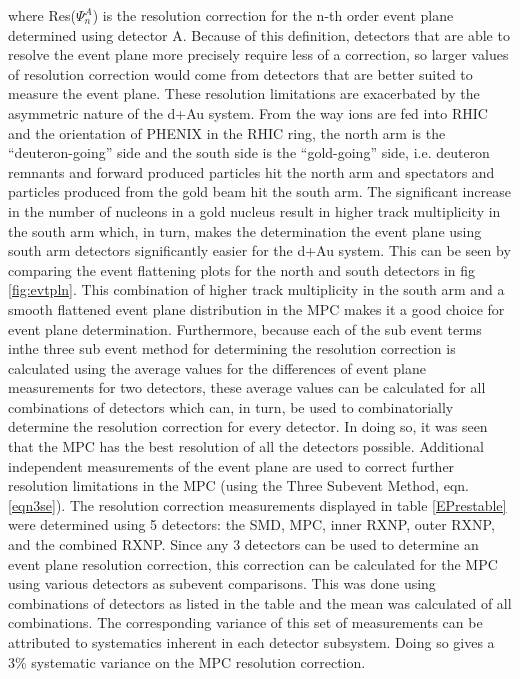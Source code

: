 where Res($\Psi_n^A$) is the resolution correction for the n-th order event plane determined using detector A. Because of this definition, detectors that are able to resolve the event plane more precisely require less of a correction, so larger values of resolution correction would come from detectors that are better suited to measure the event plane. These resolution limitations are exacerbated by the asymmetric nature of the d+Au system. From the way ions are fed into RHIC and the orientation of PHENIX in the RHIC ring, the north arm is the ``deuteron-going'' side and the south side is the ``gold-going'' side, i.e. deuteron remnants and forward produced particles hit the north arm and spectators and particles produced from the gold beam hit the south arm. The significant increase in the number of nucleons in a gold nucleus result in higher track multiplicity in the south arm which, in turn, makes the determination the event plane using south arm detectors significantly easier for the d+Au system. This can be seen by comparing the event flattening plots for the north and south detectors in fig \ref{fig:evtpln}. This combination of higher track multiplicity in the south arm and a smooth flattened event plane distribution in the MPC makes it a good choice for event plane determination. Furthermore, because each of the sub event terms inthe three sub event method for determining the resolution correction is calculated using the average values for the differences of event plane measurements for two detectors, these average values can be calculated for all combinations of detectors which can, in turn, be used to combinatorially determine the resolution correction for every detector. In doing so, it was seen that the MPC has the best resolution of all the detectors possible. Additional independent measurements of the event plane are used to correct further resolution limitations in the MPC (using the Three Subevent Method, eqn. \ref{eqn3se}). The resolution correction measurements displayed in table \ref{EPrestable} were determined using 5 detectors: the SMD, MPC, inner RXNP, outer RXNP, and the combined RXNP. Since any 3 detectors can be used to determine an event plane resolution correction, this correction can be calculated for the MPC using various detectors as subevent comparisons. This was done using combinations of detectors as listed in the table and the mean was calculated of all combinations. The corresponding variance of this set of measurements can be attributed to systematics inherent in each detector subsystem. Doing so gives a 3\% systematic variance on the MPC resolution correction.

